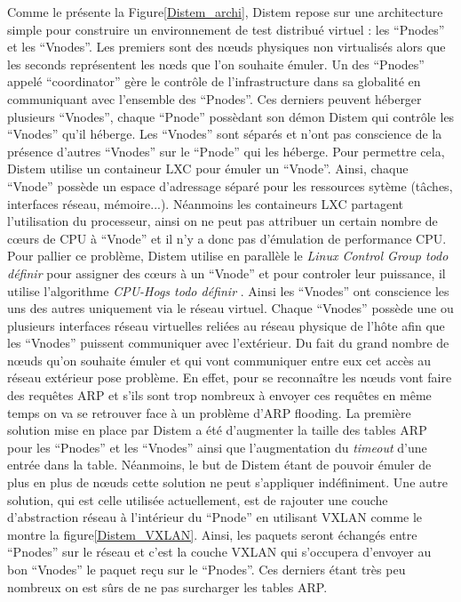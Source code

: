 Comme le présente la Figure\ref{Distem_archi}, Distem repose sur une architecture simple pour construire un environnement de test distribué virtuel : les ``Pnodes'' et les ``Vnodes''. Les premiers sont des n\oe uds physiques non virtualisés alors que les seconds représentent les n\oe ds que l'on souhaite émuler. Un des ``Pnodes'' appelé ``coordinator'' gère le contrôle de l'infrastructure dans sa globalité en communiquant avec l'ensemble des ``Pnodes''. Ces derniers peuvent héberger plusieurs ``Vnodes'', chaque ``Pnode'' possèdant son démon Distem qui contrôle les ``Vnodes'' qu'il héberge. Les ``Vnodes'' sont séparés et n'ont pas conscience de la présence d'autres ``Vnodes'' sur le ``Pnode'' qui les héberge. Pour permettre cela, Distem utilise un containeur LXC pour émuler un ``Vnode''. Ainsi, chaque ``Vnode'' possède un espace d'adressage séparé pour les ressources sytème (tâches, interfaces réseau, mémoire...). Néanmoins les containeurs LXC partagent l'utilisation du processeur, ainsi on ne peut pas attribuer un certain nombre de c\oe urs de CPU à ``Vnode'' et il n'y a donc pas d'émulation de performance CPU. Pour pallier ce problème, Distem utilise en parallèle le \textit{Linux Control Group{\color{red} todo définir}} pour assigner des c\oe urs à un ``Vnode'' et pour controler leur puissance, il utilise l'algorithme \textit{CPU-Hogs{\color{red} todo définir}} \citep{DISTEM_buchert2011methods}. Ainsi les ``Vnodes'' ont conscience les uns des autres uniquement via le réseau virtuel. Chaque ``Vnodes'' possède une ou plusieurs interfaces réseau virtuelles reliées au réseau physique de l'hôte afin que les ``Vnodes'' puissent communiquer avec l'extérieur. Du fait du grand nombre de n\oe uds qu'on souhaite émuler et qui vont communiquer entre eux cet accès au réseau extérieur pose problème. En effet, pour se reconnaître les n\oe uds vont faire des requêtes ARP et s'ils sont trop nombreux à envoyer ces requêtes en même temps on va se retrouver face à un problème d'ARP flooding. La première solution mise en place par Distem a été d'augmenter la taille des tables ARP pour les ``Pnodes'' et les ``Vnodes'' ainsi que l'augmentation du \textit{timeout} d'une entrée dans la table. Néanmoins, le but de Distem étant de pouvoir émuler de plus en plus de n\oe uds cette solution ne peut s'appliquer indéfiniment. Une autre solution, qui est celle utilisée actuellement, est de rajouter une couche d'abstraction réseau à l'intérieur du ``Pnode'' en utilisant VXLAN\citep{VXLAN_mahalingam2014virtual, DISTEM_buchert2014emulation} comme le montre la figure\ref{Distem_VXLAN}. Ainsi, les paquets seront échangés entre ``Pnodes'' sur le réseau et c'est la couche VXLAN qui s'occupera d'envoyer au bon ``Vnodes'' le paquet reçu sur le ``Pnodes''. Ces derniers étant très peu nombreux on est sûrs de ne pas surcharger les tables ARP.

